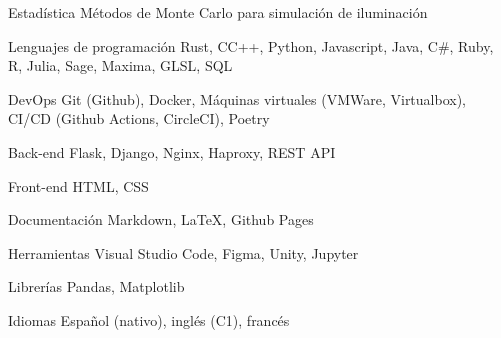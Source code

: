 

\begin{cvskills}

  \cvskill
    {Estadística}
    {Métodos de Monte Carlo para simulación de iluminación}

  \cvskill
    {Lenguajes de programación} %
    {Rust, C\/C++, Python, Javascript, Java, C\#, Ruby, R, Julia, Sage, Maxima, GLSL, SQL} %

  \cvskill
    {DevOps} %
    {Git (Github), Docker, Máquinas virtuales (VMWare, Virtualbox), CI/CD (Github Actions, CircleCI), Poetry} %

  \cvskill
    {Back-end} %
    {Flask, Django, Nginx, Haproxy, REST API} %

  \cvskill
    {Front-end} %
    {HTML, CSS} %

  \cvskill
    {Documentación}
    {Markdown, LaTeX, Github Pages}

  \cvskill
    {Herramientas}
    {Visual Studio Code, Figma, Unity, Jupyter}

  \cvskill
    {Librerías} %
    {Pandas, Matplotlib} %

  \cvskill
    {Idiomas} %
    {Español (nativo), inglés (C1), francés} %

\end{cvskills}
